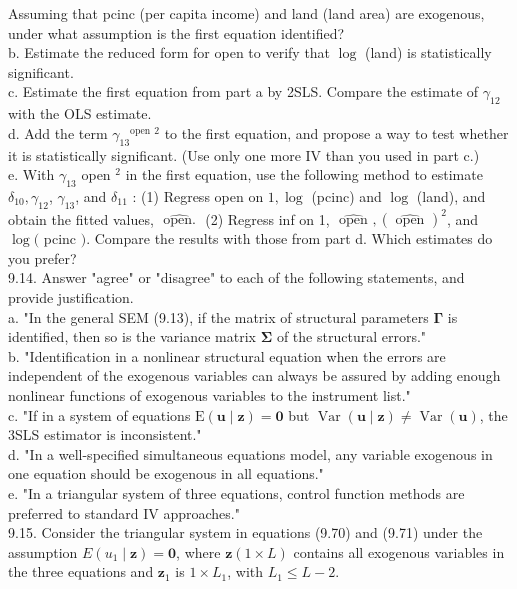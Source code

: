 \documentclass[10pt]{article}
\begin{document}
Assuming that pcinc (per capita income) and land (land area) are exogenous, under what assumption is the first equation identified?\\
b. Estimate the reduced form for open to verify that $\log$ (land) is statistically significant.\\
c. Estimate the first equation from part a by 2SLS. Compare the estimate of $\gamma_{12}$ with the OLS estimate.\\
d. Add the term $\gamma_{13}{ }^{\text {open }}{ }^{2}$ to the first equation, and propose a way to test whether it is statistically significant. (Use only one more IV than you used in part c.)\\
e. With $\gamma_{13}$ open $^{2}$ in the first equation, use the following method to estimate $\delta_{10}, \gamma_{12}$, $\gamma_{13}$, and $\delta_{11}$ : (1) Regress open on $1, \log$ (pcinc) and $\log$ (land), and obtain the fitted values, $\widehat{\text { open. }}$ (2) Regress inf on 1, $\widehat{\text { open }},(\widehat{\text { open }})^{2}$, and $\log ($ pcinc $)$. Compare the results with those from part d. Which estimates do you prefer?\\
9.14. Answer "agree" or "disagree" to each of the following statements, and provide justification.\\
a. "In the general SEM (9.13), if the matrix of structural parameters $\boldsymbol{\Gamma}$ is identified, then so is the variance matrix $\boldsymbol{\Sigma}$ of the structural errors."\\
b. "Identification in a nonlinear structural equation when the errors are independent of the exogenous variables can always be assured by adding enough nonlinear functions of exogenous variables to the instrument list."\\
c. "If in a system of equations $\mathrm{E}(\mathbf{u} \mid \mathbf{z})=\mathbf{0}$ but $\operatorname{Var}(\mathbf{u} \mid \mathbf{z}) \neq \operatorname{Var}(\mathbf{u})$, the 3SLS estimator is inconsistent."\\
d. "In a well-specified simultaneous equations model, any variable exogenous in one equation should be exogenous in all equations."\\
e. "In a triangular system of three equations, control function methods are preferred to standard IV approaches."\\
9.15. Consider the triangular system in equations (9.70) and (9.71) under the assumption $E\left(u_{1} \mid \mathbf{z}\right)=\mathbf{0}$, where $\mathbf{z}(1 \times L)$ contains all exogenous variables in the three equations and $\mathbf{z}_{1}$ is $1 \times L_{1}$, with $L_{1} \leq L-2$.\\
\end{document}
